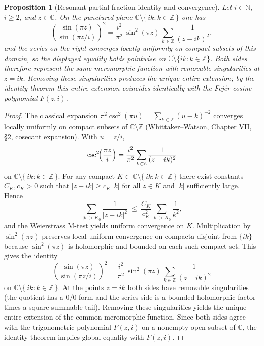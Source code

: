 \documentclass[11pt,a4paper]{amsart}
\theoremstyle{plain}
\newtheorem{proposition}[theorem]{Proposition}
\theoremstyle{definition}
\theoremstyle{remark}
\begin{document}
\begin{proposition}[Resonant partial-fraction identity and convergence]\label{prop:RPF}
Let $i\in\mathbb{N}$, $i\ge 2$, and $z\in\mathbb{C}$. On the punctured plane $\mathbb{C}\setminus\{\,i k: k\in\mathbb{Z}\,\}$ one has
\[
\left(\frac{\sin(\pi z)}{\sin(\pi z/i)}\right)^{\!2}
=\frac{i^{2}}{\pi^{2}}\,\sin^{2}(\pi z)\,\sum_{k\in\mathbb{Z}}\frac{1}{(z-i k)^{2}},
\]
and the series on the right converges locally uniformly on compact subsets of this domain, so the displayed equality holds pointwise on $\mathbb{C}\setminus\{i k:k\in\mathbb{Z}\}$. Both sides therefore represent the same meromorphic function with removable singularities at $z=i k$. Removing these singularities produces the unique entire extension; by the identity theorem this entire extension coincides identically with the Fejér cosine polynomial $F(z,i)$.
\end{proposition}

\begin{proof}
The classical expansion $\pi^{2}\csc^{2}(\pi u)=\sum_{k\in\mathbb{Z}}(u-k)^{-2}$ converges locally uniformly on compact subsets of $\mathbb{C}\setminus\mathbb{Z}$ (Whittaker–Watson, Chapter VII, §2, cosecant expansion). With $u=z/i$,
\[
\csc^{2}\!\Bigl(\frac{\pi z}{i}\Bigr)=\frac{i^{2}}{\pi^{2}}\sum_{k\in\mathbb{Z}}\frac{1}{(z-i k)^{2}}
\]
on $\mathbb{C}\setminus\{\,i k: k\in\mathbb{Z}\,\}$. For any compact $K\subset\mathbb{C}\setminus\{\,i k: k\in\mathbb{Z}\,\}$ there exist constants $C_K,c_K>0$ such that $|z-i k|\ge c_K\,|k|$ for all $z\in K$ and $|k|$ sufficiently large. Hence
\[
\sum_{|k|>K_0}\frac{1}{|z-i k|^{2}}\ \le\ \frac{C_K}{c_K^{2}}\sum_{|k|>K_0}\frac{1}{k^{2}},
\]
and the Weierstrass M-test yields uniform convergence on $K$. Multiplication by $\sin^{2}(\pi z)$ preserves local uniform convergence on compacta disjoint from $\{i k\}$ because $\sin^{2}(\pi z)$ is holomorphic and bounded on each such compact set. This gives the identity
\[
\left(\frac{\sin(\pi z)}{\sin(\pi z/i)}\right)^{\!2}
=\frac{i^{2}}{\pi^{2}}\,\sin^{2}(\pi z)\,\sum_{k\in\mathbb{Z}}\frac{1}{(z-i k)^{2}}
\]
on $\mathbb{C}\setminus\{\,i k: k\in\mathbb{Z}\,\}$. At the points $z=i k$ both sides have removable singularities (the quotient has a $0/0$ form and the series side is a bounded holomorphic factor times a square-summable tail). Removing these singularities yields the unique entire extension of the common meromorphic function. Since both sides agree with the trigonometric polynomial $F(z,i)$ on a nonempty open subset of $\mathbb{C}$, the identity theorem implies global equality with $F(z,i)$.
\end{proof}
\end{document}
